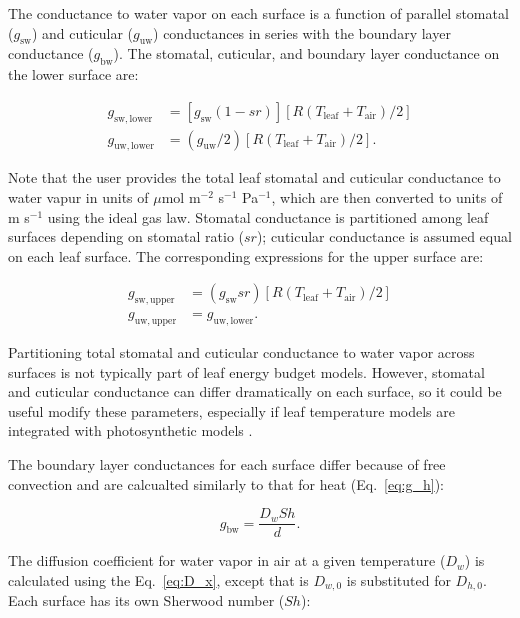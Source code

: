 \documentclass[11pt, oneside]{article}
\begin{document}
The conductance to water vapor on each surface is a function of parallel stomatal ($g_\mathrm{sw}$) and cuticular ($g_\mathrm{uw}$) conductances in series with the boundary layer conductance ($g_\mathrm{bw}$). The stomatal, cuticular, and boundary layer conductance on the lower surface are:

\begin{align}
  g_\mathrm{sw,lower} & = [g_\mathrm{sw} (1 - \mathit{sr})] [R (T_\mathrm{leaf} + T_\mathrm{air}) / 2] \\
  g_\mathrm{uw,lower} & = (g_\mathrm{uw} / 2) [R (T_\mathrm{leaf} + T_\mathrm{air}) / 2].
\end{align}

Note that the user provides the total leaf stomatal and cuticular conductance to water vapur in units of $\mu$mol m$^{-2}$ s$^{-1}$ Pa$^{-1}$, which are then converted to units of m s$^{-1}$ using the ideal gas law. Stomatal conductance is partitioned among leaf surfaces depending on stomatal ratio ($\mathit{sr}$); cuticular conductance is assumed equal on each leaf surface. The corresponding expressions for the upper surface are:

\begin{align}
  g_\mathrm{sw,upper} & = (g_\mathrm{sw} \mathit{sr}) [R (T_\mathrm{leaf} + T_\mathrm{air}) / 2] \\
  g_\mathrm{uw,upper} & = g_\mathrm{uw,lower}.
\end{align}

Partitioning total stomatal and cuticular conductance to water vapor across surfaces is not typically part of leaf energy budget models. However, stomatal \citep{Muir_2015} and cuticular \citep{Karbulkova_etal_2008} conductance can differ dramatically on each surface, so it could be useful modify these parameters, especially if leaf temperature models are integrated with photosynthetic models \citep{Muir_2019c}.

The boundary layer conductances for each surface differ because of free convection \citep{Foster_Smith_1986} and are calcualted similarly to that for heat (Eq.~\ref{eq:g_h}):

\begin{equation}
  g_\mathrm{bw} = \frac{D_w \mathit{Sh}}{d}.
\end{equation}

The diffusion coefficient for water vapor in air at a given temperature ($D_w$) is calculated using the Eq.~\ref{eq:D_x}, except that is $D_{w,0}$ is substituted for $D_{h,0}$. Each surface has its own Sherwood number ($\mathit{Sh}$):
\end{document}
